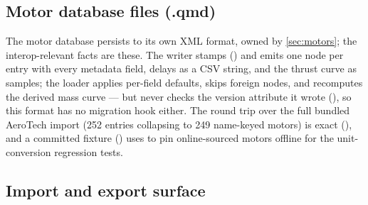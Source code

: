 \subsection{Motor database files (.qmd)}

The motor database persists to its own XML format, owned by \cref{sec:motors}; the interop-relevant
facts are these. The writer stamps 
() and emits one  node per entry with every
metadata field, delays as a CSV string, and the thrust curve as 
samples; the loader applies per-field defaults, skips foreign nodes, and recomputes the derived
mass curve --- but never checks the version attribute it wrote
(), so this format has no migration hook either. The round
trip over the full bundled AeroTech import (252  entries collapsing to 249
name-keyed motors) is exact (), and a committed
fixture () uses  to pin online-sourced motors
offline for the unit-conversion regression tests.

\subsection{Import and export surface}

